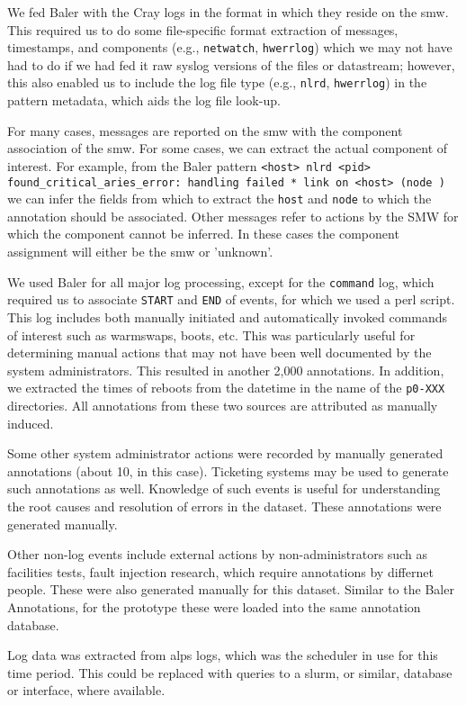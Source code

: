 We fed Baler with the Cray logs in the format in which they reside on the smw. This required us
to do some file-specific format extraction of messages, timestamps,
and components (e.g., \texttt{netwatch}, \texttt{hwerrlog}) which we may not have had to do if
we had fed it raw syslog versions of the files or datastream; however, this also enabled us
to include the log file type (e.g., \texttt{nlrd}, \texttt{hwerrlog}) in the pattern metadata,
which aids the log file look-up. 

For many cases, messages are reported
on the smw with the component association of the smw. For some cases, we can
extract the actual component of interest. For example, from the Baler pattern
\texttt{<host> nlrd <pid> found\_critical\_aries\_error: handling failed * link on <host> (node )}
we can infer the fields from which to extract the \texttt{host} and \texttt{node} to which
the annotation should be associated. Other messages refer to actions by the SMW for which
the component cannot be inferred. In these cases the component assignment will either be
the smw or 'unknown'.

We used Baler for all major log processing, except for the \texttt{command} log, which required us
to associate \texttt{START} and \texttt{END} of events, for which we used a perl script. This
log includes both manually initiated and automatically invoked commands of
interest such as warmswaps, boots, etc. This was particularly useful for
determining manual actions that may not have been well documented by the
system administrators. This resulted in another 2,000 annotations. In addition,
we extracted the times of reboots from the datetime in the name of the \texttt{p0-XXX}
directories. All annotations from these two sources are attributed as manually induced.

Some other system administrator actions were recorded by manually generated annotations
(about 10, in this case). Ticketing systems may be used to generate such annotations as well.
Knowledge of such events is useful for understanding the root causes and resolution of errors
in the dataset. These annotations were generated manually.

Other non-log events include external actions by non-administrators
such as facilities tests, fault injection research, which require
annotations by differnet people. These were also generated manually
for this dataset. Similar to the Baler Annotations, for the
prototype these were loaded into the same annotation database.

Log data was extracted from alps logs, which was the scheduler in use for
this time period. This could be replaced with queries to a slurm,
or similar, database or interface, where available.

